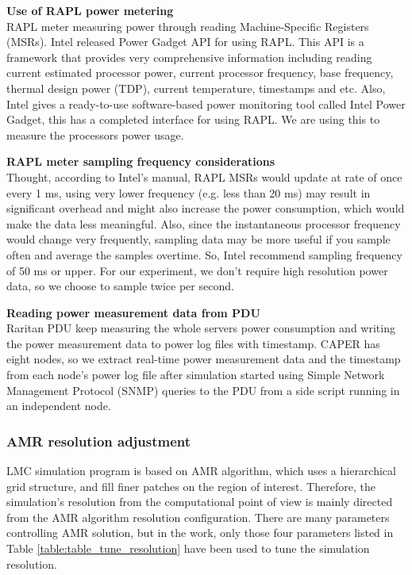 \textbf{Use of RAPL power metering}\\
RAPL meter measuring power through reading Machine-Specific Registers (MSRs). Intel released Power Gadget API for using RAPL. This API is a framework that provides very comprehensive information including reading current estimated processor power, current processor frequency, base frequency, thermal design power (TDP), current temperature, timestamps and etc. Also, Intel gives a ready-to-use software-based power monitoring tool called Intel Power Gadget, this has a completed interface for using RAPL. We are using this to measure the processors power usage. 


\textbf{RAPL meter sampling frequency considerations}\\
Thought, according to Intel’s manual,\cite{intel64and} RAPL MSRs would update at rate of once every 1 ms, using very lower frequency (e.g. less than 20 ms) may result in significant overhead and might also increase the power consumption, which would make the data less meaningful.\cite{usingtheintelpowergadgetapionmacosx} Also, since the instantaneous processor frequency would change very frequently, sampling data may be more useful if you sample often and average the samples overtime. So, Intel recommend sampling frequency of 50 ms or upper. For our experiment, we don’t require high resolution power data, so we choose to sample twice per second.


\textbf{Reading power measurement data from PDU}\\
Raritan PDU keep measuring the whole servers power consumption and writing the power measurement data to power log files with timestamp. CAPER has eight nodes, so we extract real-time power measurement data and the timestamp from each node’s power log file after simulation started using Simple Network Management Protocol (SNMP) queries to the PDU from a side script running in an independent node.


\subsubsection{AMR resolution adjustment}
LMC simulation program is based on AMR algorithm, which uses a hierarchical grid structure, and fill finer patches on the region of interest. Therefore, the simulation’s resolution from the computational point of view is mainly directed from the AMR algorithm resolution configuration. There are many parameters controlling AMR solution, but in the work, only those four parameters listed in Table \ref{table:table_tune_resolution} have been used to tune the simulation resolution. 


